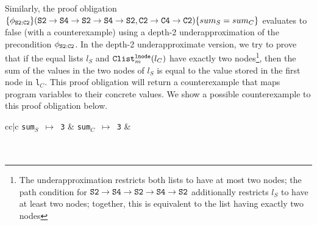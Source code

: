 Similarly, the proof obligation
$\{\phi_{{\tt S2:C2}}\} ({\tt S2\rightarrow S4\rightarrow S2\rightarrow S4\rightarrow S2}, {\tt C2\rightarrow C4\rightarrow C2}) \{sum_{S} = sum_{C}\}$ evaluates to false (with a counterexample) using
a depth-2 underapproximation of the precondition $\phi_{{\tt S2:C2}}$.
In the depth-2 underapproximate version, we try to prove that
if the equal lists $l_S$ and ${\tt Clist}^{{\tt lnode}}_{m}(l_C)$
have exactly two
nodes\footnote{The underapproximation
restricts both lists to have at most
two nodes; the path condition for ${\tt S2\rightarrow S4\rightarrow S2\rightarrow S4\rightarrow S2}$ additionally
restricts $l_S$ to have at least two nodes; together, this is equivalent to the list having
exactly two nodes}, then
the sum of the values in the two nodes of $l_S$ is equal to the
value stored in the first node in {\tt l}$_C$.
This proof obligation will return a counterexample that
maps program variables to their concrete values. We show a
possible counterexample to this proof obligation below.
%
\begin{center}
\begin{footnotesize}
\begin{tabular}{cc|c}
{\tt sum$_S$ $\mapsto$ 3} & {\tt sum$_C$ $\mapsto$ 3} &  \\
 \\
 \\
\end{tabular}
\end{footnotesize}
\end{center}
